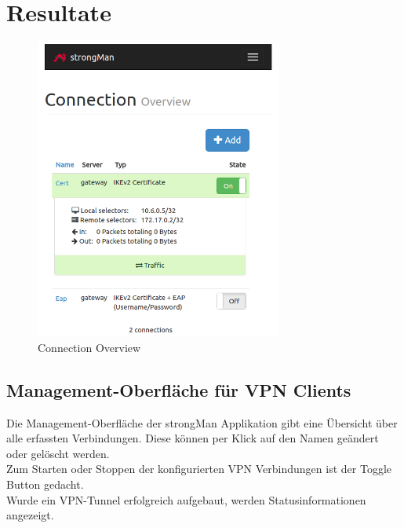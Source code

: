 \newpage
\section{Resultate}

\noindent\begin{minipage}[t]{0.5\textwidth}
\vspace{0pt}
    \begin{figure}[H]
    	\centering
    	\includegraphics[width=230pt]{images/con_overview.png}
    	\caption{Connection Overview}
    \end{figure}
\end{minipage}
\hfill
\begin{minipage}[t]{0.5\textwidth}
\vspace{0pt}
\subsection{Management-Oberfläche für VPN Clients}
Die Management-Oberfläche der strongMan Applikation gibt eine Übersicht über alle erfassten Verbindungen. Diese können per Klick auf den Namen geändert oder gelöscht werden.\\
Zum Starten oder Stoppen der konfigurierten VPN Verbindungen ist der Toggle Button gedacht.\\
Wurde ein VPN-Tunnel erfolgreich aufgebaut, werden Statusinformationen angezeigt.
\end{minipage}
\medskip


